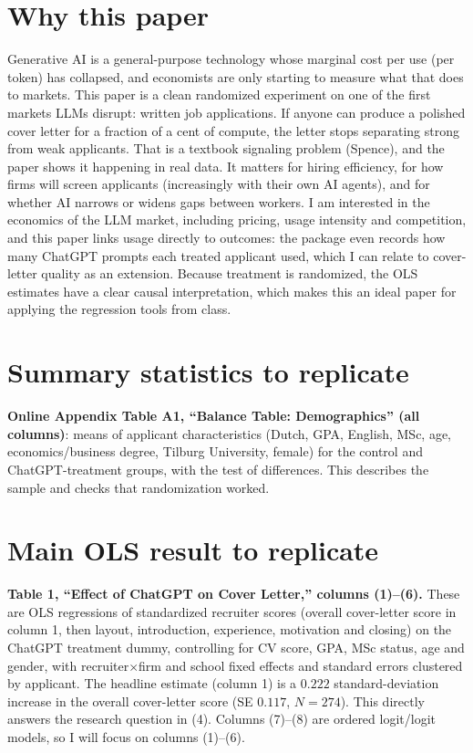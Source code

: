 \section{Why this paper}
Generative AI is a general-purpose technology whose marginal cost per use (per token) has collapsed, and economists are only starting to measure what that does to markets. This paper is a clean randomized experiment on one of the first markets LLMs disrupt: written job applications. If anyone can produce a polished cover letter for a fraction of a cent of compute, the letter stops separating strong from weak applicants. That is a textbook signaling problem (Spence), and the paper shows it happening in real data. It matters for hiring efficiency, for how firms will screen applicants (increasingly with their own AI agents), and for whether AI narrows or widens gaps between workers. I am interested in the economics of the LLM market, including pricing, usage intensity and competition, and this paper links usage directly to outcomes: the package even records how many ChatGPT prompts each treated applicant used, which I can relate to cover-letter quality as an extension. Because treatment is randomized, the OLS estimates have a clear causal interpretation, which makes this an ideal paper for applying the regression tools from class.

\section{Summary statistics to replicate}
\textbf{Online Appendix Table A1, ``Balance Table: Demographics'' (all columns)}: means of applicant characteristics (Dutch, GPA, English, MSc, age, economics/business degree, Tilburg University, female) for the control and ChatGPT-treatment groups, with the test of differences. This describes the sample and checks that randomization worked.

\section{Main OLS result to replicate}
\textbf{Table 1, ``Effect of ChatGPT on Cover Letter,'' columns (1)--(6).} These are OLS regressions of standardized recruiter scores (overall cover-letter score in column 1, then layout, introduction, experience, motivation and closing) on the ChatGPT treatment dummy, controlling for CV score, GPA, MSc status, age and gender, with recruiter$\times$firm and school fixed effects and standard errors clustered by applicant. The headline estimate (column 1) is a $0.222$ standard-deviation increase in the overall cover-letter score (SE $0.117$, $N=274$). This directly answers the research question in (4). Columns (7)--(8) are ordered logit/logit models, so I will focus on columns (1)--(6).


